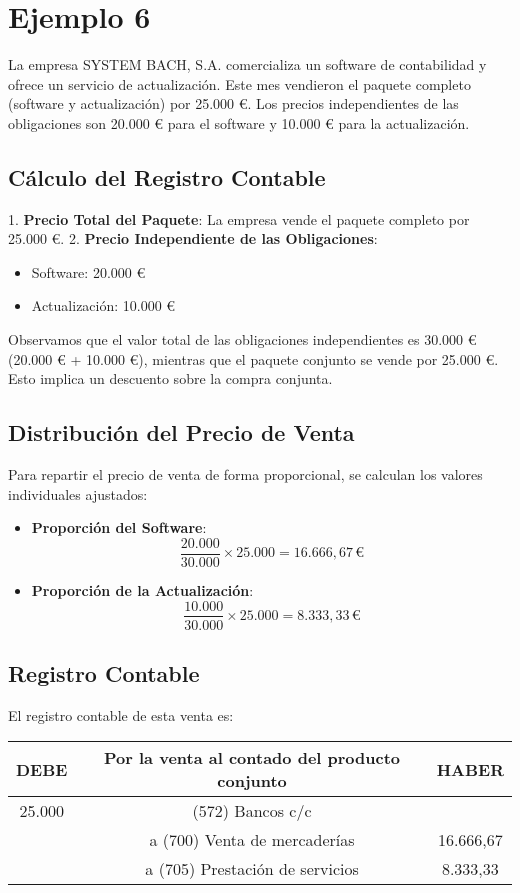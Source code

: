 \documentclass{article}
\begin{document}
\section*{Ejemplo 6}

La empresa SYSTEM BACH, S.A. comercializa un software de contabilidad y ofrece un servicio de actualización. Este mes vendieron el paquete completo (software y actualización) por 25.000 €. Los precios independientes de las obligaciones son 20.000 € para el software y 10.000 € para la actualización.

\subsection*{Cálculo del Registro Contable}

1. \textbf{Precio Total del Paquete}: La empresa vende el paquete completo por 25.000 €.
2. \textbf{Precio Independiente de las Obligaciones}:
    \begin{itemize}
        \item Software: 20.000 €
        \item Actualización: 10.000 €
    \end{itemize}

Observamos que el valor total de las obligaciones independientes es 30.000 € (20.000 € + 10.000 €), mientras que el paquete conjunto se vende por 25.000 €. Esto implica un descuento sobre la compra conjunta.

\subsection*{Distribución del Precio de Venta}
Para repartir el precio de venta de forma proporcional, se calculan los valores individuales ajustados:
\begin{itemize}
    \item \textbf{Proporción del Software}:
        \[
        \frac{20.000}{30.000} \times 25.000 = 16.666,67 \, \text{€}
        \]
    \item \textbf{Proporción de la Actualización}:
        \[
        \frac{10.000}{30.000} \times 25.000 = 8.333,33 \, \text{€}
        \]
\end{itemize}

\subsection*{Registro Contable}
El registro contable de esta venta es:
\begin{table}[H]
\centering
\begin{tabular}{|c|c|c|}
\hline
\textbf{DEBE} & \textbf{Por la venta al contado del producto conjunto} & \textbf{HABER} \\
\hline
25.000 & (572) Bancos c/c & \\
 & a (700) Venta de mercaderías & 16.666,67 \\
 & a (705) Prestación de servicios & 8.333,33 \\
\hline
\end{tabular}
\end{table}
\end{document}
